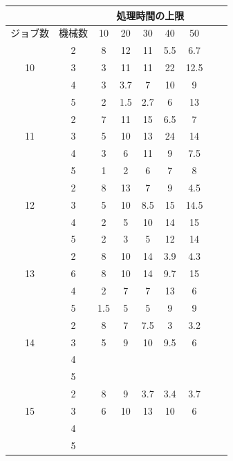 \documentclass[12pt]{optlab-bachelor}
\begin{document}
\begin{table}[htb]
  \begin{center}
    \begin{tabular}{|c|c|c|c|c|c|c|c|c|} \hline
      &  & \multicolumn{5}{c|}{処理時間の上限} \\ \hline
      ジョブ数 & 機械数& 10 & 20 & 30 & 40 & 50 \\ \hline \hline
      & 2 & 8 & 12 & 11 & 5.5 & 6.7   \\ \cline{2-7}
      10 & 3 & 3 & 11 & 11 & 22 & 12.5   \\ \cline{2-7}
      & 4 & 3 & 3.7 & 7 & 10 &  9  \\ \cline{2-7}
      & 5 & 2 & 1.5 & 2.7 & 6 & 13   \\ \hline \hline

      & 2 & 7 & 11 & 15 & 6.5 & 7   \\ \cline{2-7}
      11 & 3 & 5 & 10 & 13 & 24 & 14 \\ \cline{2-7}
      & 4 & 3 & 6 & 11 & 9 & 7.5   \\ \cline{2-7}
      & 5 & 1 & 2 & 6 & 7 & 8   \\ \hline \hline

      & 2 & 8 & 13 & 7 & 9 & 4.5   \\ \cline{2-7}
      12 & 3 & 5 & 10 & 8.5 & 15 & 14.5 \\ \cline{2-7}
      & 4 & 2 & 5 & 10 & 14 & 15   \\ \cline{2-7}
      & 5 & 2 & 3 & 5 & 12 & 14  \\ \hline \hline

      & 2 & 8 & 10 & 14 & 3.9 & 4.3 \\ \cline{2-7}
      13 & 6 & 8 & 10 & 14 & 9.7 & 15 \\ \cline{2-7}
      & 4 & 2 & 7 & 7 & 13 & 6 \\ \cline{2-7}
      & 5 & 1.5 & 5 & 5 & 9 & 9 \\ \hline \hline

      & 2 & 8 & 7 & 7.5 & 3 & 3.2 \\ \cline{2-7}
      14 & 3 & 5 & 9 & 10 & 9.5 & 6 \\ \cline{2-7}
      & 4 &  &  &  &  &  \\ \cline{2-7}
      & 5 &  &  &  &  &  \\ \hline \hline

      & 2 & 8 & 9 & 3.7 & 3.4 & 3.7 \\ \cline{2-7}
      15 & 3 & 6 & 10 & 13 & 10 & 6 \\ \cline{2-7}
      & 4 &  &  &  &  &  \\ \cline{2-7}
      & 5 &  &  &  &  &  \\ \hline \hline


\end{tabular}
\end{center}
\end{table}
\end{document}
